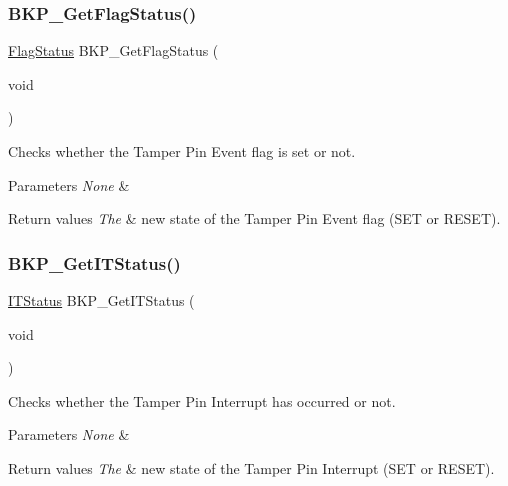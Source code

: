 \subsubsection{\texorpdfstring{BKP\_GetFlagStatus()}{BKP\_GetFlagStatus()}}
{\footnotesize\ttfamily \mbox{\hyperlink{group___exported__types_ga89136caac2e14c55151f527ac02daaff}{Flag\+Status}} B\+K\+P\+\_\+\+Get\+Flag\+Status (\begin{DoxyParamCaption}\item[{void}]{ }\end{DoxyParamCaption})}



Checks whether the Tamper Pin Event flag is set or not. 


\begin{DoxyParams}{Parameters}
{\em None} & \\
\hline
\end{DoxyParams}

\begin{DoxyRetVals}{Return values}
{\em The} & new state of the Tamper Pin Event flag (S\+ET or R\+E\+S\+ET). \\
\hline
\end{DoxyRetVals}
\mbox{\label{group___b_k_p___exported___functions_ga99566c9f1f17f499020606cb63511494}} 
\subsubsection{\texorpdfstring{BKP\_GetITStatus()}{BKP\_GetITStatus()}}
{\footnotesize\ttfamily \mbox{\hyperlink{group___exported__types_gaacbd7ed539db0aacd973a0f6eca34074}{I\+T\+Status}} B\+K\+P\+\_\+\+Get\+I\+T\+Status (\begin{DoxyParamCaption}\item[{void}]{ }\end{DoxyParamCaption})}



Checks whether the Tamper Pin Interrupt has occurred or not. 


\begin{DoxyParams}{Parameters}
{\em None} & \\
\hline
\end{DoxyParams}

\begin{DoxyRetVals}{Return values}
{\em The} & new state of the Tamper Pin Interrupt (S\+ET or R\+E\+S\+ET). \\
\hline
\end{DoxyRetVals}
\mbox{\label{group___b_k_p___exported___functions_gab8dbd0c4773f6edb98a28c8ff6a2ead0}} 
